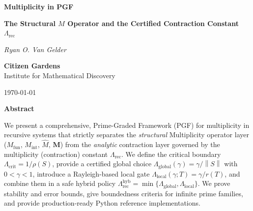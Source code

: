 \documentclass[11pt]{article}
\newcommand{\Mfun}{M_{\mathrm{fun}}}
\newcommand{\Mint}{M_{\mathrm{int}}}
\newcommand{\Mhat}{\widehat{M}}
\newcommand{\Mdiag}{\mathbf{M}}
\newcommand{\Lrec}{\Lambda_{\mathrm{rec}}}
\newcommand{\Lglobal}{\Lambda_{\mathrm{global}}}
\newcommand{\Llocal}{\Lambda_{\mathrm{local}}}
\newcommand{\Lcrit}{\Lambda_{\mathrm{crit}}}
\newcommand{\Lhyb}{\Lambda_{\mathrm{rec}}^{\mathrm{hyb}}}
\newcommand{\norm}[1]{\left\lVert #1\right\rVert}
\theoremstyle{definition}
\begin{document}
\begin{titlepage}
    \centering

    {\Huge\bfseries Multiplicity in PGF \par}
    \vspace{0.5cm}
    {\LARGE\bfseries The Structural $M$ Operator and the Certified Contraction Constant $\Lrec$ \par}

  \vspace{2cm}
    {\LARGE\itshape Ryan O. Van Gelder \par}
    \vspace{1cm}
    {\Large\bfseries Citizen Gardens} \\
    \vspace{0.5cm}
    \Large{Institute for Mathematical Discovery} \\ 
    \vspace{0.5cm}
    {\normalsize \today \par}

 \vfill

    {\bfseries Abstract \par}
    \vspace{0.5em}
    \begin{minipage}{0.85\textwidth}
        \small
We present a comprehensive, Prime-Graded Framework (PGF) for multiplicity in recursive systems that strictly separates the \emph{structural} Multiplicity operator layer ($\Mfun$, $\Mint$, $\Mhat$, $\Mdiag$) from the \emph{analytic} contraction layer governed by the multiplicity (contraction) constant $\Lrec$. We define the critical boundary $\Lcrit=1/\rho(S)$, provide a certified global choice $\Lglobal(\gamma)=\gamma/\norm{S}$ with $0<\gamma<1$, introduce a Rayleigh-based local gate $\Llocal(\gamma;T)=\gamma/r(T)$, and combine them in a safe hybrid policy $\Lhyb=\min\{\Lglobal,\Llocal\}$. We prove stability and error bounds, give boundedness criteria for infinite prime families, and provide production-ready Python reference implementations.

 \end{minipage}
\end{titlepage}
\newpage

\tableofcontents
\end{document}
